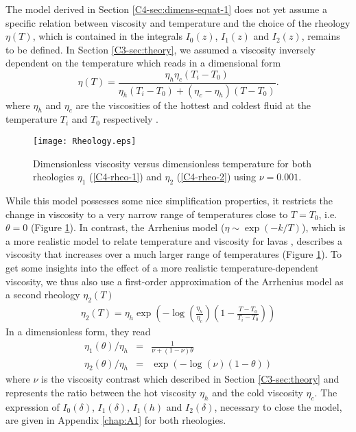 The model derived in  Section \ref{C4-sec:dimens-equat-1} does not yet
assume a specific  relation between viscosity and  temperature and the
choice of the rheology $\eta(T)$,  which is contained in the integrals
$I_0(z)$, $I_1(z)$  and $I_2(z)$, remains  to be defined.   In Section
\ref{C3-sec:theory}, we assumed a viscosity inversely dependent on the
temperature which reads in a dimensional form
\begin{equation}
  \eta(T)=\frac{\eta_h
    \eta_c(T_i-T_0)}{\eta_h(T_i-T_0)+(\eta_c-\eta_h)(T-T_0)}.
\end{equation}
where $\eta_h$  and $\eta_c$  are the viscosities  of the  hottest and
coldest  fluid  at  the   temperature  $T_i$  and  $T_0$  respectively
\citep{Bercovici:2007vc}.
\begin{figure}[h!]
  \begin{center}
    \graphicspath{ {/Users/thorey/Documents/These/Projet/Refroidissement/Skin_Model/Figure/Figure_Heating/} }
    \texttt{[image: Rheology.eps]}
    \caption{Dimensionless viscosity  versus dimensionless temperature
      for  both  rheologies  $\eta_1$ (\ref{C4-rheo-1})  and  $\eta_2$
      (\ref{C4-rheo-2}) using $\nu=0.001$.}
    \label{C4-Rheology}
  \end{center}
\end{figure}
While  this model  possesses some  nice simplification  properties, it
restricts  the  change  in  viscosity   to  a  very  narrow  range  of
temperatures    close   to    $T=T_0$,   i.e.     $\theta=0$   (Figure
\ref{C4-Rheology}).     In     contrast,    the     Arrhenius    model
($\eta \sim  \exp(-k/T)$), which is  a more realistic model  to relate
temperature and viscosity  for lavas \citep{Blatt:2ViMWPc0}, describes
a viscosity  that increases over  a much larger range  of temperatures
(Figure \ref{C4-Rheology}).  To get some insights into the effect of a
more  realistic temperature-dependent  viscosity, we  thus also  use a
first-order approximation of the Arrhenius  model as a second rheology
$\eta_2(T)$ \citep{Diniega:2013eh}
\begin{eqnarray}
  \eta_2(T)                          =                          \eta_h
  \exp\left(-\log\left(\frac{\eta_h}{\eta_c}\right)\left(1-\frac{T-T_0}{T_i-T_0}\right)\right)
\end{eqnarray}
In a dimensionless form, they read
\begin{eqnarray}
  \eta_1(\theta)/\eta_h&=&\frac{1}{\nu+(1-\nu)\theta} \label{C4-rheo-1}\\
  \eta_2(\theta)/\eta_h&=&\exp\left(-\log(\nu)\left(1-\theta\right)\right)  \label{C4-rheo-2}
\end{eqnarray}
where  $\nu$ is  the  viscosity contrast  which  described in  Section
\ref{C3-sec:theory} and represents the ratio between the hot viscosity
$\eta_h$  and   the  cold  viscosity  $\eta_c$.    The  expression  of
$I_0(\delta)$, $I_1(\delta)$, $I_1(h)$ and $I_2(\delta)$, necessary to
close  the  model,  are  given  in  Appendix  \ref{chap:A1}  for  both
rheologies.

